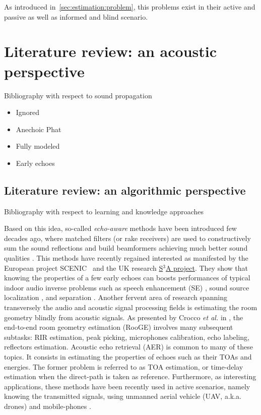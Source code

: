 As introduced in~\cref{sec:estimation:problem}, this problems exist in their active and passive as well as informed and blind scenario.



\section{Literature review: an acoustic perspective}
Bibliography with respect to sound propagation
\begin{itemize}
    \item Ignored
    \item Anechoic Phat
    \item Fully modeled
    \item Early echoes
\end{itemize}

\subsection{Literature review: an algorithmic perspective}\cite{subsec:application:algos}
Bibliography with respect to learning and knowledge approaches


Based on this idea, so-called \textit{echo-aware} methods have been introduced few decades ago, where matched filters (or rake receivers) are used to constructively sum the sound reflections  and build beamformers achieving much better sound qualities .
This methods have recently regained interested as manifested by the European project SCENIC~ and the UK research \href{http://www.s3a-spatialaudio.org/}{S$^3$A project}.
They show that knowing the properties of a few early echoes can boosts performances of typical indoor audio inverse problems such as speech enhancement (SE) , sound source localization , and separation .
Another fervent area of research spanning transversely the audio and acoustic signal processing fields is estimating the room geometry blindly from acoustic signals.
As presented by Crocco \textit{et al.} in , the end-to-end room geometry estimation (RooGE) involves many subsequent subtasks:
RIR estimation, peak picking, microphones calibration, echo labeling, reflectors estimation. Acoustic echo retrieval (AER) is common to many of these topics. It consists in estimating the properties of echoes such as their TOAs and energies. The former problem is referred to as TOA estimation, or time-delay estimation when the direct-path is taken as reference. Furthermore, as interesting applications, these methods have been recently used in active scenarios, namely knowing the transmitted signals, using unmanned aerial vehicle (UAV, a.k.a. drones)  and mobile-phones .


